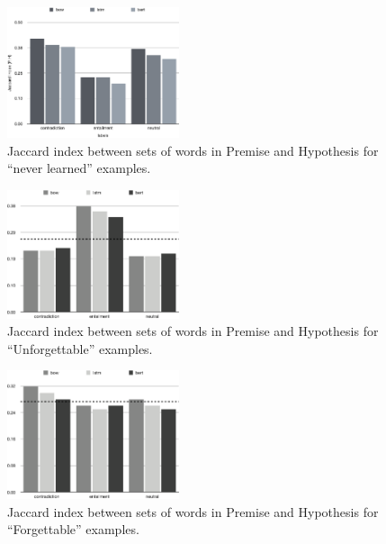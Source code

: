 \begin{figure}[t]
\centering
  \includegraphics[width=0.45\textwidth]{figures/wordoverlap_unlearned.pdf}
  \caption{Jaccard index between sets of words in Premise and Hypothesis for ``never learned'' examples.}
\label{fig:wordoverlap-unlearned}
\end{figure}

\begin{figure}[t]
\centering
  \includegraphics[width=0.45\textwidth]{figures/wordoverlap_unforgettables.pdf}
  \caption{Jaccard index between sets of words in Premise and Hypothesis for ``Unforgettable'' examples.}
\label{fig:wordoverlap-unforg}
\end{figure}

\begin{figure}[t]
\centering
  \includegraphics[width=0.45\textwidth]{figures/wordoverlap_forg.pdf}
  \caption{Jaccard index between sets of words in Premise and Hypothesis for ``Forgettable'' examples.}
\label{fig:wordoverlap-forg}
\end{figure}

\fi

